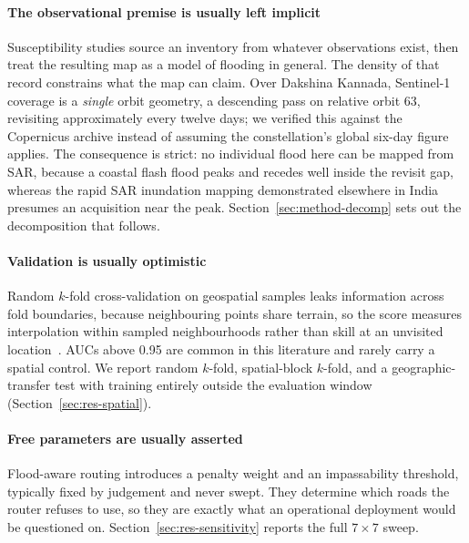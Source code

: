 \documentclass[journal]{IEEEtran}
\begin{document}
\paragraph{The observational premise is usually left implicit}
Susceptibility studies source an inventory from whatever observations exist, then
treat the resulting map as a model of flooding in general. The density of that
record constrains what the map can claim. Over Dakshina Kannada,
Sentinel-1~\citep{torres2012} coverage is a \emph{single} orbit geometry, a
descending pass on relative orbit 63, revisiting approximately every twelve days;
we verified this against the Copernicus archive instead of assuming the
constellation's global six-day figure applies. The consequence is strict: no
individual flood here can be mapped from SAR, because a coastal flash flood peaks
and recedes well inside the revisit gap, whereas the rapid SAR inundation mapping
demonstrated elsewhere in India~\citep{arora2023} presumes an acquisition near
the peak. Section~\ref{sec:method-decomp} sets out the decomposition that
follows.

\paragraph{Validation is usually optimistic}
Random $k$-fold cross-validation on geospatial samples leaks information across
fold boundaries, because neighbouring points share terrain, so the score measures
interpolation within sampled neighbourhoods rather than skill at an unvisited
location~\citep{roberts2017,ploton2020,meyer2021}. AUCs above 0.95 are common in
this literature and rarely carry a spatial control. We report random $k$-fold,
spatial-block $k$-fold, and a geographic-transfer test with training entirely
outside the evaluation window (Section~\ref{sec:res-spatial}).

\paragraph{Free parameters are usually asserted}
Flood-aware routing introduces a penalty weight and an impassability threshold,
typically fixed by judgement and never swept. They determine which roads the
router refuses to use, so they are exactly what an operational deployment would
be questioned on. Section~\ref{sec:res-sensitivity} reports the full
$7\times7$ sweep.
\end{document}
